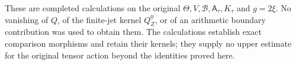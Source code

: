These are completed calculations on the original
\(\Theta,V,\mathscr B,\mathsf A_\tau,K_\tau\) and \(g=2\xi\). No
vanishing of \(Q\), of the finite-jet kernel \(Q_Z^0\), or of an
arithmetic boundary contribution was used to obtain them. The
calculations establish exact comparison morphisms and retain their
kernels; they supply no upper estimate for the original tensor action
beyond the identities proved here.
